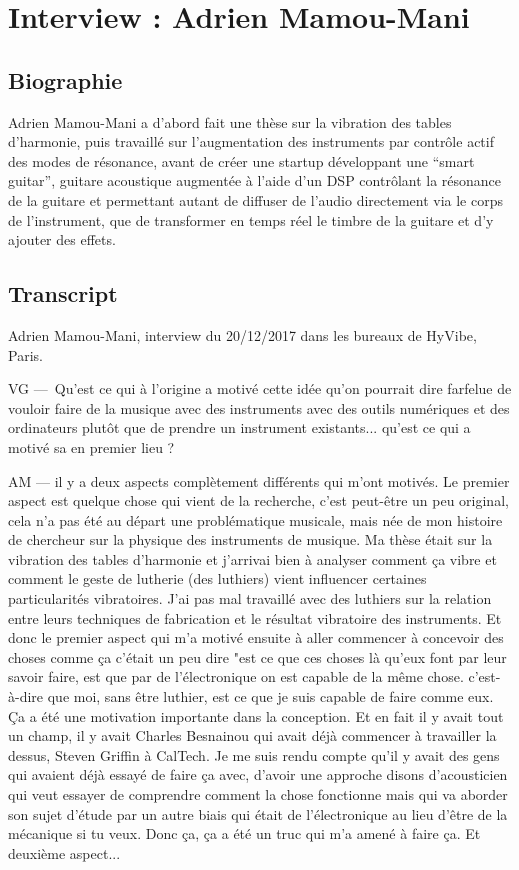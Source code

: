 \chapter{Interview : Adrien Mamou-Mani}
\label{appendix:mamou-mani}

\section*{Biographie}

\noindent Adrien Mamou-Mani a d'abord fait une thèse sur la vibration des tables d'harmonie, puis travaillé sur l'augmentation des instruments par contrôle actif des modes de résonance, avant de créer une startup développant une ``smart guitar'', guitare acoustique augmentée à l'aide d'un DSP contrôlant la résonance de la guitare et permettant autant de diffuser de l'audio directement via le corps de l'instrument, que de transformer en temps réel le timbre de la guitare et d'y ajouter des effets.

\section*{Transcript}

\noindent Adrien Mamou-Mani, interview du 20/12/2017 dans les bureaux de HyVibe, Paris.

VG — Qu'est ce qui à l'origine a motivé cette idée qu'on pourrait dire farfelue de vouloir faire de la musique avec des instruments avec des outils numériques et des ordinateurs plutôt que de prendre un instrument existants... qu'est ce qui a motivé sa en premier lieu ?


AM — il y a deux aspects complètement différents qui m'ont motivés. Le premier aspect est quelque chose qui vient de la recherche, c'est peut-être un peu original, cela n'a pas été au départ une problématique musicale, mais née de mon histoire de chercheur sur la physique des instruments de musique. Ma thèse était sur la vibration des tables d'harmonie et j'arrivai bien à analyser comment ça vibre et comment le geste de lutherie (des luthiers) vient influencer certaines particularités vibratoires. J'ai pas mal travaillé avec des luthiers sur la relation entre leurs techniques de fabrication et le résultat vibratoire des instruments.
Et donc le premier aspect qui m'a motivé ensuite à aller commencer à concevoir des choses comme ça c'était un peu dire "est ce que ces choses là qu'eux font par leur savoir faire, est que par de l'électronique on est capable de la même chose. c'est-à-dire que moi, sans être luthier, est ce que je suis capable de faire comme eux. Ça a été une motivation importante dans la conception. Et en fait il y avait tout un champ, il y avait Charles Besnainou qui avait déjà commencer à travailler la dessus, Steven Griffin à CalTech. 
Je me suis rendu compte qu'il y avait des gens qui avaient déjà essayé de faire ça avec, d'avoir une approche disons d'acousticien qui veut essayer de comprendre comment la chose fonctionne mais qui va aborder son sujet d'étude par un autre biais qui était de l'électronique au lieu d'être de la mécanique si tu veux. 
Donc ça, ça a été un truc qui m'a amené à faire ça. Et deuxième aspect... 

